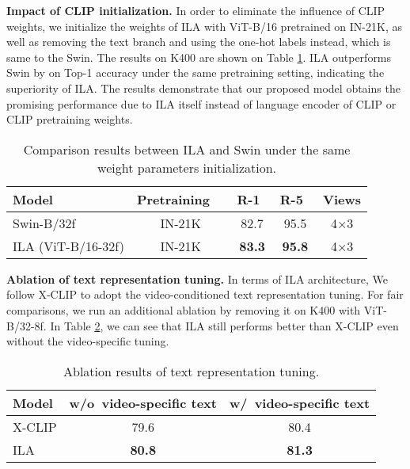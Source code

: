 \documentclass[10pt,twocolumn,letterpaper]{article}
\begin{document}
\noindent\textbf{Impact of CLIP initialization.} In order to eliminate the influence of CLIP weights, we initialize the weights of ILA with ViT-B/16 pretrained on IN-21K, as well as removing the text branch and using the one-hot labels instead, which is same to the Swin. The results on K400 are shown on Table \ref{table:11}. ILA outperforms Swin by  on Top-1 accuracy under the same pretraining setting, indicating the superiority of ILA. The results demonstrate that our proposed model obtains the promising performance due to ILA itself instead of language encoder of CLIP or CLIP pretraining weights. 

\begin{table}[htbp]\small
  \caption{Comparison results between ILA and Swin under the same weight parameters initialization.}
  \vspace{-0.2cm}
  \begin{center}
  \renewcommand\arraystretch{1.2}
  \begin{tabular}{lcccc}
    \toprule
    Model           & Pretraining~~ & R-1~ & R-5~ & Views \\ \midrule
Swin-B/32f~~ & IN-21K   & 82.7      & 95.5      & 4×3   \\
ILA (ViT-B/16-32f)  & IN-21K   & \textbf{83.3}      & \textbf{95.8}      & 4×3   \\ \bottomrule  
  \end{tabular}
  \end{center}
  \label{table:11}
  \vspace{-0.2in}
\end{table}

\noindent\textbf{Ablation of text representation tuning.} In terms of ILA architecture, We follow X-CLIP to adopt the video-conditioned text representation tuning. For fair comparisons, we run an additional ablation by removing it on K400 with ViT-B/32-8f. In Table \ref{table:12}, we can see that ILA still performs better than X-CLIP even without the video-specific tuning.

\begin{table}[htbp]\small
  \caption{Ablation results of text representation tuning.}
  \begin{center}
  \renewcommand\arraystretch{1.2}
  \begin{tabular}{lcc}
    \toprule
    Model  & w/o~video-specific text & w/~video-specific text \\ \midrule
X-CLIP & 79.6                         & 80.4                        \\
ILA    & \textbf{80.8}                         & \textbf{81.3}                        \\ \bottomrule
  \end{tabular}
  \end{center}
  \label{table:12}
  \vspace{-0.2in}
\end{table}
\end{document}
